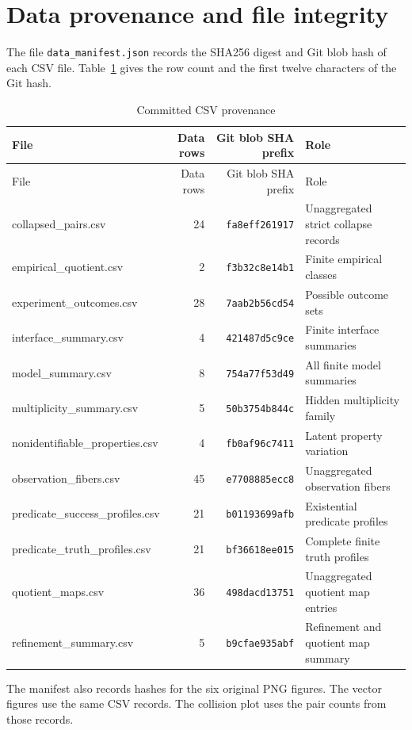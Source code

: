 \section{Data provenance and file integrity}
\label{app:provenance}

The file \nolinkurl{data_manifest.json} records the SHA256 digest and Git blob hash of each CSV file. Table~\ref{tab:manifest} gives the row count and the first twelve characters of the Git hash.

\begin{longtable}{@{}lrrl@{}}
\caption{Committed CSV provenance}\label{tab:manifest}\\
\toprule
File & Data rows & Git blob SHA prefix & Role \\
\midrule
\endfirsthead
\toprule
File & Data rows & Git blob SHA prefix & Role \\
\midrule
\endhead
collapsed\_pairs.csv & 24 & \texttt{fa8eff261917} & Unaggregated strict collapse records \\
empirical\_quotient.csv & 2 & \texttt{f3b32c8e14b1} & Finite empirical classes \\
experiment\_outcomes.csv & 28 & \texttt{7aab2b56cd54} & Possible outcome sets \\
interface\_summary.csv & 4 & \texttt{421487d5c9ce} & Finite interface summaries \\
model\_summary.csv & 8 & \texttt{754a77f53d49} & All finite model summaries \\
multiplicity\_summary.csv & 5 & \texttt{50b3754b844c} & Hidden multiplicity family \\
nonidentifiable\_properties.csv & 4 & \texttt{fb0af96c7411} & Latent property variation \\
observation\_fibers.csv & 45 & \texttt{e7708885ecc8} & Unaggregated observation fibers \\
predicate\_success\_profiles.csv & 21 & \texttt{b01193699afb} & Existential predicate profiles \\
predicate\_truth\_profiles.csv & 21 & \texttt{bf36618ee015} & Complete finite truth profiles \\
quotient\_maps.csv & 36 & \texttt{498dacd13751} & Unaggregated quotient map entries \\
refinement\_summary.csv & 5 & \texttt{b9cfae935abf} & Refinement and quotient map summary \\
\bottomrule
\end{longtable}

The manifest also records hashes for the six original PNG figures. The vector figures use the same CSV records. The collision plot uses the pair counts from those records.

